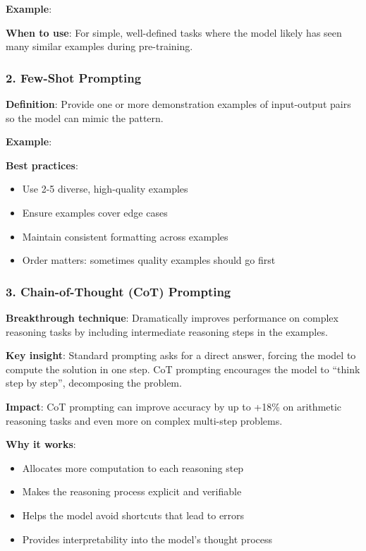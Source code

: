 \documentclass{article}
\begin{document}
\textbf{Example}:

\textbf{When to use}: For simple, well-defined tasks where the model likely has seen many similar examples during pre-training.

\subsubsection{2. Few-Shot Prompting}

\textbf{Definition}: Provide one or more demonstration examples of input-output pairs so the model can mimic the pattern.

\textbf{Example}:

\textbf{Best practices}:
\begin{itemize}
\item Use 2-5 diverse, high-quality examples
\item Ensure examples cover edge cases
\item Maintain consistent formatting across examples
\item Order matters: sometimes quality examples should go first
\end{itemize}

\subsubsection{3. Chain-of-Thought (CoT) Prompting}

\textbf{Breakthrough technique}: Dramatically improves performance on complex reasoning tasks by including intermediate reasoning steps in the examples.

\textbf{Key insight}: Standard prompting asks for a direct answer, forcing the model to compute the solution in one step. CoT prompting encourages the model to ``think step by step'', decomposing the problem.

\begin{tcolorbox}[colback=yellow!5!white, colframe=orange!50!black, title=Power of Chain-of-Thought]
\textbf{Impact}: CoT prompting can improve accuracy by up to +18\% on arithmetic reasoning tasks and even more on complex multi-step problems.

\textbf{Why it works}:
\begin{itemize}
\item Allocates more computation to each reasoning step
\item Makes the reasoning process explicit and verifiable
\item Helps the model avoid shortcuts that lead to errors
\item Provides interpretability into the model's thought process
\end{itemize}
\end{tcolorbox}
\end{document}
